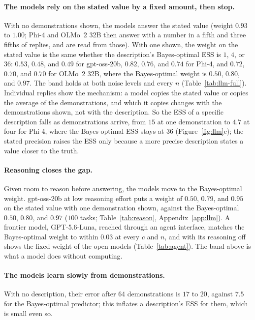 \documentclass{article}
\begin{document}
\paragraph{The models rely on the stated value by a fixed amount, then stop.} With no demonstrations shown, the models answer the stated value (weight $0.93$ to $1.00$; Phi-4 and OLMo~2 32B then answer with a number in a fifth and three fifths of replies, and are read from those). With one shown, the weight on the stated value is the same whether the description's Bayes-optimal ESS is $1$, $4$, or $36$: $0.53$, $0.48$, and $0.49$ for gpt-oss-20b, $0.82$, $0.76$, and $0.74$ for Phi-4, and $0.72$, $0.70$, and $0.70$ for OLMo~2 32B, where the Bayes-optimal weight is $0.50$, $0.80$, and $0.97$. The band holds at both noise levels and every $n$ (Table~\ref{tab:llm-full}). Individual replies show the mechanism: a model copies the stated value or copies the average of the demonstrations, and which it copies changes with the demonstrations shown, not with the description. So the ESS of a specific description falls as demonstrations arrive, from $15$ at one demonstration to $4.7$ at four for Phi-4, where the Bayes-optimal ESS stays at $36$ (Figure~\ref{fig:llm}c); the stated precision raises the ESS only because a more precise description states a value closer to the truth.

\paragraph{Reasoning closes the gap.} Given room to reason before answering, the models move to the Bayes-optimal weight. gpt-oss-20b at low reasoning effort puts a weight of $0.50$, $0.79$, and $0.95$ on the stated value with one demonstration shown, against the Bayes-optimal $0.50$, $0.80$, and $0.97$ ($100$ tasks; Table~\ref{tab:reason}, Appendix~\ref{app:llm}). A frontier model, GPT-5.6-Luna, reached through an agent interface, matches the Bayes-optimal weight to within $0.03$ at every $c$ and $n$, and with its reasoning off shows the fixed weight of the open models (Table~\ref{tab:agent}). The band above is what a model does without computing.

\paragraph{The models learn slowly from demonstrations.} With no description, their error after $64$ demonstrations is $17$ to $20$, against $7.5$ for the Bayes-optimal predictor; this inflates a description's ESS for them, which is small even so.
\end{document}
